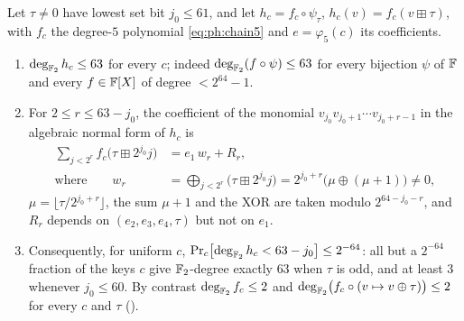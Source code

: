 \begin{proposition}\label{prop:ph:twist-degree}
Let $\tau\ne0$ have lowest set bit $j_0\le61$, and let $h_c=f_c\circ\psi_\tau$,
$h_c(v)=f_c(v\boxplus \tau)$, with $f_c$ the degree-$5$ polynomial
\eqref{eq:ph:chain5} and $e=\varphi_5(c)$ its coefficients.
\begin{enumerate}[label=(\roman*)]
\item $\deg_{\mathbb{F}_2}h_c\le63$ for every $c$; indeed $\deg_{\mathbb{F}_2}(f\circ\psi)\le63$
      for every bijection $\psi$ of $\mathbb{F}$ and every $f\in\mathbb{F}[X]$ of degree
      $<2^{64}-1$.
\item For $2\le r\le63-j_0$, the coefficient of the monomial
      $v_{j_0}v_{j_0+1}\cdots v_{j_0+r-1}$ in the algebraic normal form of
      $h_c$ is
      \[
      \begin{aligned}
        \sum_{j<2^r}f_c\bigl(\tau\boxplus 2^{j_0}j\bigr)&=e_1\,w_r+R_r ,\\
        \text{where}\qquad
        w_r&=\bigoplus_{j<2^r}\bigl(\tau\boxplus2^{j_0}j\bigr)=2^{j_0+r}\bigl(\mu\oplus(\mu+1)\bigr)\ne0 ,
      \end{aligned}
      \]
      $\mu=\lfloor \tau/2^{j_0+r}\rfloor$, the sum $\mu+1$ and the XOR are
      taken modulo $2^{64-j_0-r}$, and $R_r$ depends on $(e_2,e_3,e_4,\tau)$
      but not on $e_1$.
\item Consequently, for uniform $c$,
      $\Pr_c\bigl[\deg_{\mathbb{F}_2}h_c<63-j_0\bigr]\le2^{-64}$: all but a $2^{-64}$
      fraction of the keys $c$ give $\mathbb{F}_2$-degree exactly $63$ when $\tau$ is
      odd, and at least $3$ whenever $j_0\le60$.  By contrast
      $\deg_{\mathbb{F}_2}f_c\le2$ and $\deg_{\mathbb{F}_2}\bigl(f_c\circ(v\mapsto v\oplus \tau)\bigr)\le2$
      for every $c$ and $\tau$ ().
\end{enumerate}
\end{proposition}
